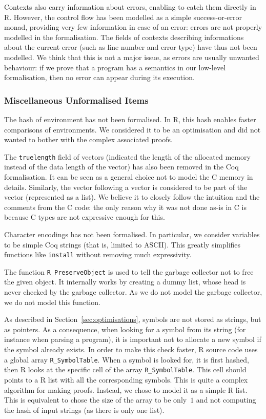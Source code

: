 \documentclass{article}
\newcommand\Coq{Coq}
\newcommand\R{R}
\newcommand\Cn{C}
\begin{document}
Contexts also carry information about errors,
enabling to catch them directly in \R{}.
However,  the control flow has been modelled as a simple
success-or-error monad,
providing very few information in case of an error:
errors are not properly modelled in the formalisation.
The fields of contexts describing informations about
the current error
(such as line number and error type)
have thus not been modelled.
We think that this is not a major issue,
as errors are usually unwanted behaviour:
if we prove that a program has a semantics
in our low-level formalisation,
then no error can appear during its execution.


\subsubsection{Miscellaneous Unformalised Items}
\label{sec:coverage:unformalised}

The hash of environment has not been formalised.
In \R{}, this hash enables faster comparisons of environments.
We considered it to be an optimisation and did not wanted to bother
with the complex associated proofs.

The \texttt{truelength} field of vectors
(indicated the length of the allocated memory
instead of the data length of the vector)
has also been removed in the \Coq{} formalisation.
It can be seen as a general choice not to model the \Cn{} memory in details.
Similarly, the vector following a vector is considered to be part
of the vector (represented as a list).
We believe it to closely follow the intuition and the comments from the \Cn{} code:
the only reason why it was not done as-is in \Cn{} is because \Cn{} types
are not expressive enough for this.

Character encodings has not been formalised.
In particular, we consider variables to be simple
\Coq{} strings (that is, limited to ASCII).
This greatly simplifies functions like \texttt{install}
without removing much expressivity.

The function \texttt{R_PreserveObject} is used to tell the garbage collector
not to free the given object.
It internally works by creating a dummy list,
whose head is never checked by the garbage collector.
As we do not model the garbage collector,
we do not model this function.

As described in Section~\ref{sec:optimisations},
symbols are not stored as strings,
but as pointers.
As a consequence, when looking for a symbol
from its string (for instance when parsing a program),
it is important not to allocate a new symbol if the
symbol already exists.
In order to make this check faster,
\R{} source code uses a global array \texttt{R_SymbolTable}.
When a symbol is looked for, it is first hashed,
then \R{} looks at the specific cell
of the array \texttt{R_SymbolTable}.
This cell should points to a \R{} list with all the corresponding symbols.
This is quite a complex algorithm for making proofs.
Instead, we chose to model it as a simple \R{} list.
This is equivalent to chose the size of the array to be only~\(1\)
and not computing the hash of input strings
(as there is only one list).
\end{document}
